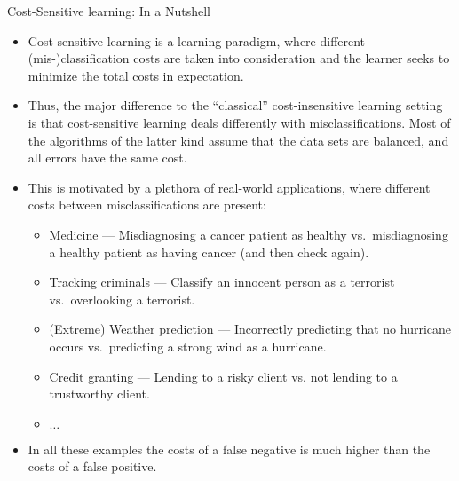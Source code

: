 \begin{vbframe}{Cost-Sensitive learning: In a Nutshell}
	\scriptsize{
		\begin{itemize}
%			
		\item Cost-sensitive learning is a learning paradigm, where different (mis-)classification costs are taken into consideration and the learner seeks to minimize the total costs in expectation.
%
		\item Thus, the major difference to the ``classical'' cost-insensitive learning setting is that cost-sensitive learning deals differently with misclassifications. Most of the algorithms of the latter kind assume that the data sets are balanced, and all errors have the same cost.
		
%
		\item This is motivated by a plethora of real-world applications, where different costs between misclassifications are present:
%		
		\begin{itemize}
			\scriptsize
%			
			\item Medicine --- Misdiagnosing a cancer patient as healthy vs.\ misdiagnosing a healthy patient as having cancer (and then check again).
			\item Tracking criminals ---  Classify an innocent person as a terrorist vs.\ overlooking a terrorist.
			\item (Extreme) Weather prediction ---  Incorrectly predicting that no hurricane occurs vs.\ predicting a strong wind as a hurricane.
%			
			\item Credit granting --- Lending to a risky client vs. not lending to a trustworthy client.
			\item $\ldots$
%    	
%			
		\end{itemize}
%	
		\item In all these examples the costs of a false negative is much higher than the costs of a false positive.
%
		\end{itemize}
		
	}
\end{vbframe}


